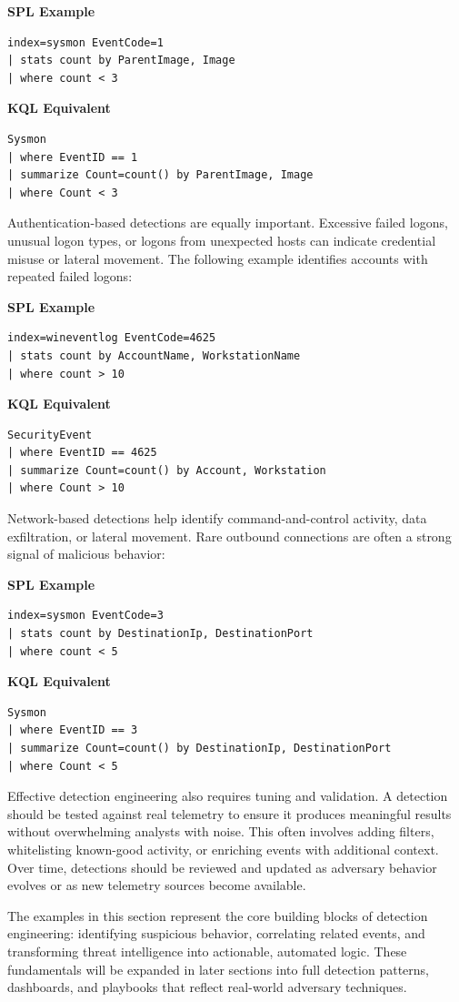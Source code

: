 \textbf{SPL Example}
\begin{lstlisting}
index=sysmon EventCode=1
| stats count by ParentImage, Image
| where count < 3
\end{lstlisting}

\textbf{KQL Equivalent}
\begin{lstlisting}
Sysmon
| where EventID == 1
| summarize Count=count() by ParentImage, Image
| where Count < 3
\end{lstlisting}

Authentication-based detections are equally important. Excessive failed logons, unusual logon types, or logons from unexpected hosts can indicate credential misuse or lateral movement. The following example identifies accounts with repeated failed logons:

\textbf{SPL Example}
\begin{lstlisting}
index=wineventlog EventCode=4625
| stats count by AccountName, WorkstationName
| where count > 10
\end{lstlisting}

\textbf{KQL Equivalent}
\begin{lstlisting}
SecurityEvent
| where EventID == 4625
| summarize Count=count() by Account, Workstation
| where Count > 10
\end{lstlisting}

Network-based detections help identify command-and-control activity, data exfiltration, or lateral movement. Rare outbound connections are often a strong signal of malicious behavior:

\textbf{SPL Example}
\begin{lstlisting}
index=sysmon EventCode=3
| stats count by DestinationIp, DestinationPort
| where count < 5
\end{lstlisting}

\textbf{KQL Equivalent}
\begin{lstlisting}
Sysmon
| where EventID == 3
| summarize Count=count() by DestinationIp, DestinationPort
| where Count < 5
\end{lstlisting}

Effective detection engineering also requires tuning and validation. A detection should be tested against real telemetry to ensure it produces meaningful results without overwhelming analysts with noise. This often involves adding filters, whitelisting known-good activity, or enriching events with additional context. Over time, detections should be reviewed and updated as adversary behavior evolves or as new telemetry sources become available.

The examples in this section represent the core building blocks of detection engineering: identifying suspicious behavior, correlating related events, and transforming threat intelligence into actionable, automated logic. These fundamentals will be expanded in later sections into full detection patterns, dashboards, and playbooks that reflect real-world adversary techniques.

